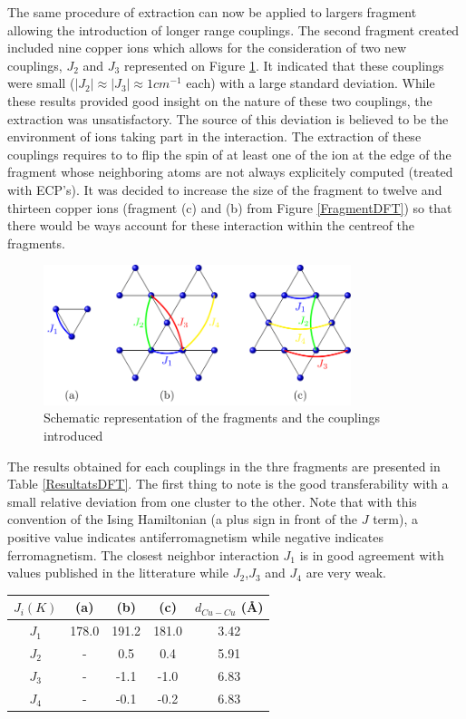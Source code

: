 \documentclass[10pt]{report}
\numberwithin{equation}{section}
\begin{document}
The same procedure of extraction can now be applied to largers fragment allowing the introduction of longer range couplings.
The second fragment created included nine copper ions which allows for the consideration of two new couplings, $J_2$ and $J_3$ represented on Figure \ref{CouplageDFT}.
It indicated that these couplings were small ($|J_{2}|\approx |J_{3}|\approx1 cm^{-1}$ each) with a large standard deviation.
While these results provided good insight on the nature of these two couplings, the extraction was unsatisfactory.
The source of this deviation is believed to be the environment of ions taking part in the interaction. 
The extraction of these couplings requires to to flip the spin of at least one of the ion at the edge of the fragment whose neighboring atoms are not always explicitely computed (treated with ECP's).
It was decided to increase the size of the fragment to twelve and thirteen copper ions (fragment (c) and (b) from Figure \ref{FragmentDFT}) so that there would be ways account for these interaction within the centreof the fragments.


\begin{figure}[!ht]
    \centering
    \includegraphics[width=0.8\textwidth]{Images/ModeleDFT_plan.png}
    \caption{Schematic representation of the fragments and the couplings introduced}
    \label{CouplageDFT}
\end{figure}

The results obtained for each couplings in the thre fragments are presented in Table \ref{ResultatsDFT}.
The first thing to note is the good transferability with a small relative deviation from one cluster to the other.
Note that with this convention of the Ising Hamiltonian (a plus sign in front of the $J$ term), a positive value indicates antiferromagnetism while negative indicates ferromagnetism.
The closest neighbor interaction $J_1$ is in good agreement with values published in the litterature while $J_2$,$J_3$ and $J_4$ are very weak. 

\begin{center}\label{ResultatsDFT}
    \begin{tabular}{c c c c c}
        \hline
        $J_i (K)$ & (a) & (b) & (c) & $d_{Cu-Cu}$ (\AA{}) \\
        \hline
        $J_1$ & 178.0 & 191.2 & 181.0 &3.42\\
        $J_2$ & - & 0.5  & 0.4& 5.91\\
        $J_3$ & -& -1.1& -1.0&6.83\\
        $J_4$ & -& -0.1 & -0.2& 6.83\\
        \hline
    \end{tabular}
\end{center}
\end{document}
